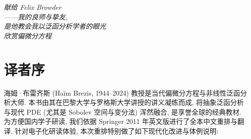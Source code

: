 
\thispagestyle{empty}
\vspace*{0.22\textheight}
\begin{center}
	\large\itshape
	献给 Felix Browder\\
	——我的良师与挚友,\\
	是他教会我以泛函分析学者的眼光\\
	欣赏偏微分方程
\end{center}
\cleardoublepage

\chapter*{译者序}
\enlargethispage{2\baselineskip}

海姆·布雷齐斯 (Haïm Brezis, 1944--2024) 教授是当代偏微分方程与非线性泛函分析大师.
本书由其在巴黎大学与罗格斯大学讲授的讲义凝练而成,
将抽象泛函分析与现代 PDE (尤其是 Sobolev 空间与变分法) 浑然融合, 是享誉全球的经典教材.
为方便国内学子研读, 我们依据 Springer 2011 年英文版进行了全本中文重排与翻译.
针对电子化研读体验, 本次重排特别做了如下现代化改进与体例说明:

